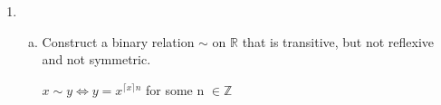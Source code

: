 \documentclass[12pt]{amsart}
\begin{document}
\begin{enumerate}[{\bfseries 1.}]
\begin{enumerate}[(a)]
		\vspace{0.3in}
		$x\sim y\Longleftrightarrow x = \frac{1}{y}$

	\vspace{0.3in}
	\item Prove that $\sim$ is not reflexive.
		\begin{proof}
		Because $2 \neq \frac{1}{2}$, $x \nsim x$.
		\end{proof}
	\vspace{0.1in}
	\item Prove that $\sim$ is symmetric.
		\begin{proof}
		Let $x, y\in\mathbb{R}$ such that $x\sim y$, then $x = \frac{1}{y}$, and $xy = 1 \iff y = \frac{1}{x}$, so $y\sim x$.
		\end{proof}
	\vspace{0.1in}
	\item Prove that $\sim$ is not transitive.
		\begin{proof}
		Because $2 = \frac{1}{\frac{1}{2}}$, and $\frac{1}{2} = \frac{1}{2}$, so $2 \sim \frac{1}{2}$, and $\frac{1}{2} \sim 2$, but $2 \neq \frac{1}{2}$, so $2\nsim 2$.
		\end{proof}
	\end{enumerate}

\newpage
\item\begin{enumerate}[(a)]
	\vspace{0.1in}
	\item Construct a binary relation $\sim$ on $\mathbb{R}$ that is transitive, but not reflexive and not symmetric.

		\vspace{0.3in}
		$x\sim y\Longleftrightarrow y = x^{\lceil x \rceil n}$ for some n $\in\mathbb{Z}$


\end{enumerate}
\end{enumerate}
\end{document}
